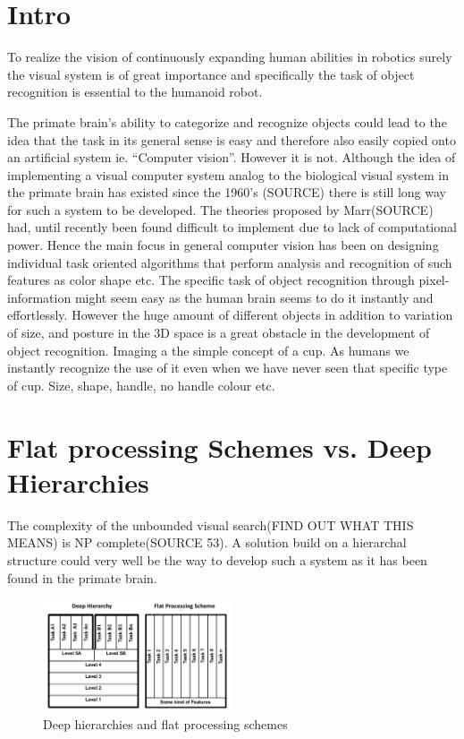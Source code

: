 \section{Intro}

To realize the vision of continuously expanding human abilities in robotics surely the visual system is of great importance and specifically the task of object recognition is essential to the humanoid robot.

The primate brain's ability to categorize and recognize objects could lead to the idea that the task in its general sense is easy and therefore also easily copied onto an artificial system ie. “Computer vision”. However it is not.
Although the idea of implementing a visual computer system analog to the biological visual system in the primate brain has existed since the 1960's (SOURCE) there is still long way for such a system to be developed. The theories proposed by Marr(SOURCE) had, until recently been found difficult to implement due to lack of computational power. Hence the main focus in general computer vision has been on designing individual task oriented algorithms that perform analysis and recognition of such features as color shape etc.
The specific task of object recognition through pixel-information might seem easy as the human brain seems to do it instantly and effortlessly. However the huge amount of different objects in addition to variation of size, and posture in the 3D space is a great obstacle in the development of object recognition. Imaging a the simple concept of a cup. As humans we instantly recognize the use of it even when we have never seen that specific type of cup. Size, shape, handle, no handle colour etc.


\section*{Flat processing Schemes vs. Deep Hierarchies}

The complexity of the unbounded visual search(FIND OUT WHAT THIS MEANS) is NP complete(SOURCE 53).  A solution build on a hierarchal structure could very well be the way to develop such a system as it has been found in the primate brain.

\begin{figure}[h!] %
\centering
\includegraphics[width=0.5\textwidth]{graphics/deepvsflat}
\caption{Deep hierarchies and flat processing schemes}
\label{fig:deepvsflat}
\end{figure}


